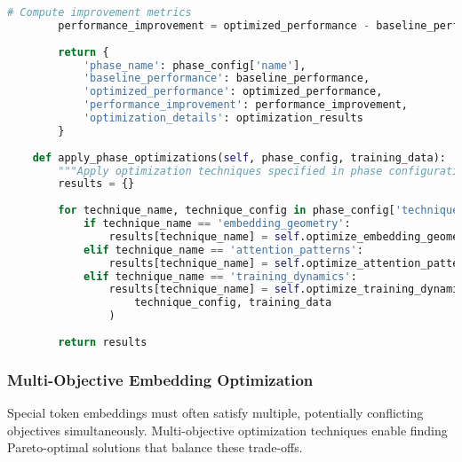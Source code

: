 \begin{lstlisting}[language=Python, caption=Geometric embedding optimization framework]
        # Compute improvement metrics
        performance_improvement = optimized_performance - baseline_performance
        
        return {
            'phase_name': phase_config['name'],
            'baseline_performance': baseline_performance,
            'optimized_performance': optimized_performance,
            'performance_improvement': performance_improvement,
            'optimization_details': optimization_results
        }
    
    def apply_phase_optimizations(self, phase_config, training_data):
        """Apply optimization techniques specified in phase configuration."""
        results = {}
        
        for technique_name, technique_config in phase_config['techniques'].items():
            if technique_name == 'embedding_geometry':
                results[technique_name] = self.optimize_embedding_geometry(technique_config)
            elif technique_name == 'attention_patterns':
                results[technique_name] = self.optimize_attention_patterns(technique_config)
            elif technique_name == 'training_dynamics':
                results[technique_name] = self.optimize_training_dynamics(
                    technique_config, training_data
                )
        
        return results
\end{lstlisting}

\subsubsection{Multi-Objective Embedding Optimization}

Special token embeddings must often satisfy multiple, potentially conflicting objectives simultaneously. Multi-objective optimization techniques enable finding Pareto-optimal solutions that balance these trade-offs.

